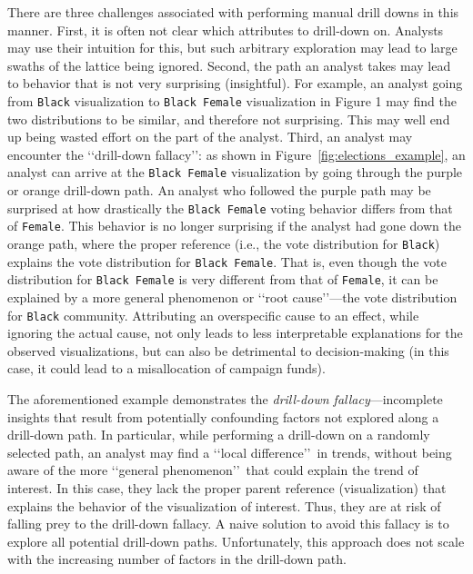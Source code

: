 \par There are three challenges associated with performing manual drill downs in this manner. First, it is often not clear which attributes to drill-down on. Analysts may use their intuition for this, but such arbitrary exploration may lead to large swaths of the lattice being ignored. Second, the path an analyst takes may lead to behavior that is not very surprising (insightful).  
For example, an analyst going from \texttt{Black} visualization to \texttt{Black Female} visualization in Figure 1 may find the two distributions to be similar, and therefore not surprising. This may well end up being wasted effort on the part of the analyst. Third, an analyst may encounter the \lq\lq drill-down fallacy\rq\rq : as shown in Figure~\ref{fig:elections_example}, an analyst can arrive at the \texttt{Black Female} visualization by going through the purple or orange drill-down path. An analyst who followed the purple path may be surprised at how drastically the \texttt{Black Female} voting behavior differs from that of \texttt{Female}. This behavior is no longer surprising if the analyst had gone down the orange path, where the proper reference (i.e., the vote distribution for \texttt{Black}) explains the vote distribution for \texttt{Black Female}. That is, even though the vote distribution for \texttt{Black Female} is very different from that of \texttt{Female}, it can be explained by a more general phenomenon or \lq\lq root cause\rq\rq ---the vote distribution for \texttt{Black} community. Attributing an overspecific cause to an effect, while ignoring the actual cause, not only leads to less interpretable explanations for the observed visualizations, but can also be detrimental to decision-making (in this case, it could lead to a misallocation of campaign funds).
\par The aforementioned example demonstrates the \emph{drill-down fallacy}---incomplete insights that result from potentially confounding factors not explored along a drill-down path. In particular, while performing a drill-down on a randomly selected path, an analyst may find a \lq\lq local difference\rq\rq\ in trends, without being aware of the more \lq\lq general phenomenon\rq\rq\ that could explain the trend of interest. In this case, they lack the proper parent reference (visualization) that explains the behavior of the visualization of interest. Thus, they are at risk of falling prey to the drill-down fallacy. A naive solution to avoid this fallacy is to explore all potential drill-down paths. Unfortunately, this approach does not scale with the increasing number of factors in the drill-down path.
